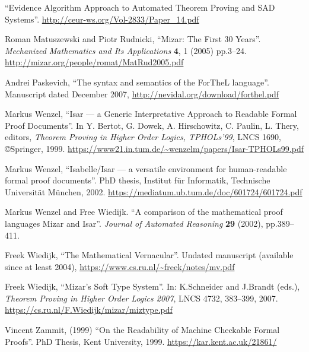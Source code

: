 \begin{enumerate}[label={[\arabic*]},left=0pt]
  ``Evidence  Algorithm  Approach  to  Automated  Theorem  Proving
  and SAD Systems''.
  \url{http://ceur-ws.org/Vol-2833/Paper_14.pdf}
\item\label{matuszewski:mizar} Roman Matuszewski and Piotr Rudnicki,
  ``Mizar: The First 30 Years''.
  \emph{Mechanized Mathematics and Its Applications} \textbf{4}, 1 (2005) pp.3--24.
  \url{http://mizar.org/people/romat/MatRud2005.pdf}
\item\label{paskevich-forthel} Andrei Paskevich,
  ``The syntax and semantics of the ForTheL language''.
  Manuscript dated December 2007,
  \url{http://nevidal.org/download/forthel.pdf}
\item\label{wenzel:tphols99} Markus Wenzel,
  ``Isar --- a Generic Interpretative Approach to Readable Formal Proof
  Documents''.
  In Y. Bertot, G. Dowek, A. Hirschowitz, C. Paulin, L. Thery, editors, \emph{Theorem Proving in Higher Order Logics, TPHOLs'99}, LNCS 1690, \copyright Springer, 1999.
  \url{https://www21.in.tum.de/~wenzelm/papers/Isar-TPHOLs99.pdf}
\item\label{wenzel:phd-thesis} Markus Wenzel,
  ``Isabelle/Isar --- a versatile environment for human-readable formal
  proof documents''.
  PhD thesis,
  Institut f\"ur Informatik, Technische Universit\"at M\"unchen, 2002.
  \url{https://mediatum.ub.tum.de/doc/601724/601724.pdf}
\item Markus Wenzel and Free Wiedijk.
  ``A comparison of the mathematical proof languages Mizar and Isar''.
  \emph{Journal of Automated Reasoning} \textbf{29} (2002), pp.389--411.
\item\label{wiedijk-mv} Freek Wiedijk,
  ``The Mathematical Vernacular''.
  Undated manuscript (available since at least 2004),
  \url{https://www.cs.ru.nl/~freek/notes/mv.pdf}
\item\label{wiedijk-soft-type} Freek Wiedijk,
  ``Mizar's Soft Type System''.
  In: K.Schneider and J.Brandt (eds.), \emph{Theorem Proving in Higher Order Logics 2007}, LNCS 4732, 383--399, 2007.
  \url{https://cs.ru.nl/F.Wiedijk/mizar/miztype.pdf}
\item\label{zammit:phd-thesis} Vincent Zammit,  (1999)
  ``On the Readability of Machine Checkable Formal Proofs''.
  PhD Thesis, Kent University, 1999.
  \url{https://kar.kent.ac.uk/21861/}
\end{enumerate}
